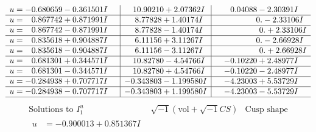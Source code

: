 \documentclass[1p]{elsarticle_modified}
\theoremstyle{definition}
\newcommand{\I}{\sqrt{-1}}
\begin{document}
$$\begin{array}{c|c|c}
\begin{aligned}
u &= -0.680659 - 0.361501 I\end{aligned}
 & \phantom{-}10.90210 + 2.07362 I & \phantom{-}0.04088 - 2.30391 I \\ \hline\begin{aligned}
u &= \phantom{-}0.867742 + 0.871991 I\end{aligned}
 & \phantom{-}8.77828 + 1.40174 I & \phantom{-0.000000 } 0. - 2.33106 I \\ \hline\begin{aligned}
u &= \phantom{-}0.867742 - 0.871991 I\end{aligned}
 & \phantom{-}8.77828 - 1.40174 I & \phantom{-0.000000 -}0. + 2.33106 I \\ \hline\begin{aligned}
u &= \phantom{-}0.835618 + 0.904887 I\end{aligned}
 & \phantom{-}6.11156 + 3.11267 I & \phantom{-0.000000 } 0. - 2.66928 I \\ \hline\begin{aligned}
u &= \phantom{-}0.835618 - 0.904887 I\end{aligned}
 & \phantom{-}6.11156 - 3.11267 I & \phantom{-0.000000 -}0. + 2.66928 I \\ \hline\begin{aligned}
u &= \phantom{-}0.681301 + 0.344571 I\end{aligned}
 & \phantom{-}10.82780 - 4.54766 I & -0.10220 + 2.48977 I \\ \hline\begin{aligned}
u &= \phantom{-}0.681301 - 0.344571 I\end{aligned}
 & \phantom{-}10.82780 + 4.54766 I & -0.10220 - 2.48977 I \\ \hline\begin{aligned}
u &= -0.284938 + 0.707717 I\end{aligned}
 & -0.343803 - 1.199580 I & -4.23003 + 5.53729 I \\ \hline\begin{aligned}
u &= -0.284938 - 0.707717 I\end{aligned}
 & -0.343803 + 1.199580 I & -4.23003 - 5.53729 I\\
 \hline 
 \end{array}$$\newpage$$\begin{array}{c|c|c}  
\text{Solutions to }I^u_{1}& \I (\text{vol} + \sqrt{-1}CS) & \text{Cusp shape}\\
 \hline 
\begin{aligned}
u &= -0.900013 + 0.851367 I\end{aligned}

\end{array}$$
\end{document}
